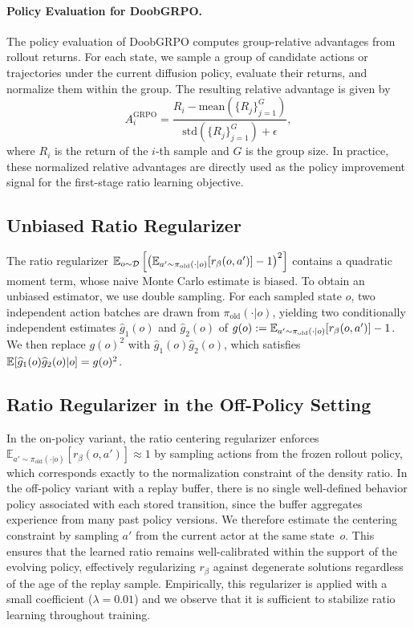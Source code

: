 \paragraph{Policy Evaluation for DoobGRPO.}
The policy evaluation of DoobGRPO computes group-relative advantages from rollout returns.
For each state, we sample a group of candidate actions or trajectories under the current diffusion policy, evaluate their returns, and normalize them within the group.
The resulting relative advantage is given by
\begin{equation}
A_i^{\mathrm{GRPO}}
=
\frac{R_i-\mathrm{mean}(\{R_j\}_{j=1}^{G})}
{\mathrm{std}(\{R_j\}_{j=1}^{G})+\epsilon},
\end{equation}
where $R_i$ is the return of the $i$-th sample and $G$ is the group size.
In practice, these normalized relative advantages are directly used as the policy improvement signal for the first-stage ratio learning objective.

\subsection{Unbiased Ratio Regularizer}

The ratio regularizer
$\operatorname*{{\mathbb{E}}}_{o\sim\mathcal D}\left[\left(\operatorname*{{\mathbb{E}}}_{a'\sim \pi_{\mathrm{old}}(\cdot|o)}[r_\beta(o,a')]-1\right)^2\right]$
contains a quadratic moment term, whose naive Monte Carlo estimate is biased.
To obtain an unbiased estimator, we use double sampling.
For each sampled state $o$, two independent action batches are drawn from $\pi_{\mathrm{old}}(\cdot|o)$, yielding two conditionally independent estimates $\hat g_1(o)$ and $\hat g_2(o)$ of
$g(o):=\operatorname*{{\mathbb{E}}}_{a'\sim\pi_{\mathrm{old}}(\cdot|o)}[r_\beta(o,a')]-1$.
We then replace $g(o)^2$ with $\hat g_1(o)\hat g_2(o)$, which satisfies
$\operatorname*{{\mathbb{E}}}[\widehat g_1(o)\widehat g_2(o)|o]=g(o)^2$.

\subsection{Ratio Regularizer in the Off-Policy Setting}

In the on-policy variant, the ratio centering regularizer enforces
$\mathbb{E}_{a' \sim \pi_{\mathrm{old}}(\cdot|o)}[r_\beta(o,a')] \approx 1$
by sampling actions from the frozen rollout policy, which corresponds exactly to the normalization constraint of the density ratio.
In the off-policy variant with a replay buffer, there is no single well-defined behavior policy associated with each stored transition, since the buffer aggregates experience from many past policy versions.
We therefore estimate the centering constraint by sampling $a'$ from the current actor at the same state~$o$.
This ensures that the learned ratio remains well-calibrated within the support of the evolving policy, effectively regularizing $r_\beta$ against degenerate solutions regardless of the age of the replay sample.
Empirically, this regularizer is applied with a small coefficient ($\lambda = 0.01$) and we observe that it is sufficient to stabilize ratio learning throughout training.

